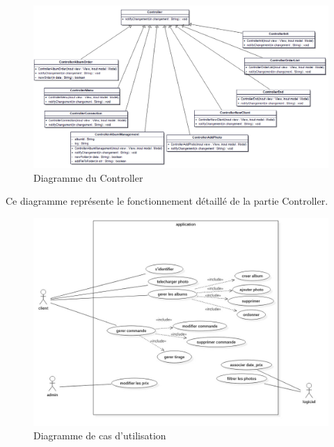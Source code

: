\documentclass{article}
\begin{document}
\begin{flushleft}
\begin{figure}[!h]
  \begin{center}
    \includegraphics[scale=0.45]{fig6} %
    \caption{Diagramme du Controller}
  \end{center}
\end{figure}

Ce diagramme représente le fonctionnement détaillé de la partie Controller.
\vspace{1\baselineskip}
\begin{figure}[!h]
  \begin{center}
    \includegraphics[scale=0.40]{fig7} %
    \caption{Diagramme de cas d'utilisation}
  \end{center}
\end{figure}


\end{flushleft}
\end{document}
